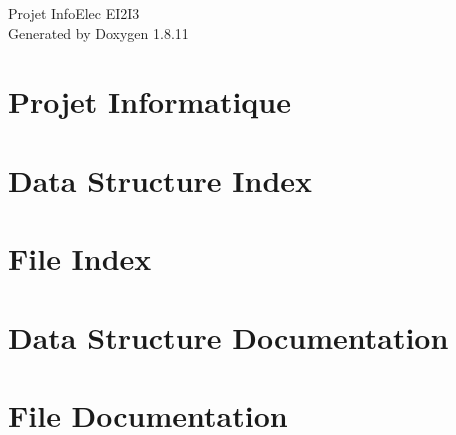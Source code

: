 \documentclass[twoside]{book}
\newcommand{\+}{\discretionary{\mbox{\scriptsize$\hookleftarrow$}}{}{}}
\newcommand{\clearemptydoublepage}{%
  \newpage{\pagestyle{empty}\cleardoublepage}%
}
\begin{document}
\hypersetup{pageanchor=false,
             bookmarksnumbered=true,
             pdfencoding=unicode
            }
\begin{titlepage}
\vspace*{7cm}
\begin{center}%
{\Large Projet Info\+Elec E\+I2\+I3 }\\
\vspace*{1cm}
{\large Generated by Doxygen 1.8.11}\\
\end{center}
\end{titlepage}
\clearemptydoublepage
\tableofcontents
\clearemptydoublepage
{}
\hypersetup{pageanchor=true}

\chapter{Projet Informatique}
\label{index}\hypertarget{index}{}
\chapter{Data Structure Index}

\chapter{File Index}

\chapter{Data Structure Documentation}
















\chapter{File Documentation}














\backmatter
\newpage
{}
\clearemptydoublepage
{}
\printindex
\end{document}
